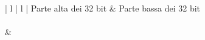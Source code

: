 \begin{center}
\begin{tabular}{ | l | l | }
\hline
	Parte alta dei 32 bit & Parte bassa dei 32 bit \\
\hline
{} \\
\hline
{} &  \\
\hline
\end{tabular}
\end{center}
